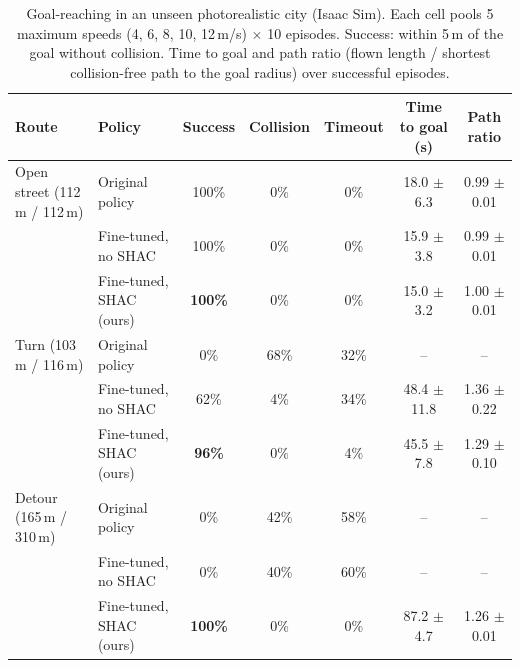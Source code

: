 \begin{table}[t]
\centering
\small
\caption{Goal-reaching in an unseen photorealistic city (Isaac Sim). Each cell pools 5 maximum speeds (4, 6, 8, 10, 12\,m/s) $\times$ 10 episodes. Success: within 5\,m of the goal without collision. Time to goal and path ratio (flown length / shortest collision-free path to the goal radius) over successful episodes.}
\label{tab:city}
\begin{tabular}{llccccc}
\toprule
Route & Policy & Success & Collision & Timeout & Time to goal (s) & Path ratio \\
\midrule
Open street (112\,m / 112\,m) & Original policy & 100\% & 0\% & 0\% & 18.0 $\pm$ 6.3 & 0.99 $\pm$ 0.01 \\
 & Fine-tuned, no SHAC & 100\% & 0\% & 0\% & 15.9 $\pm$ 3.8 & 0.99 $\pm$ 0.01 \\
 & Fine-tuned, SHAC (ours) & \textbf{100\%} & 0\% & 0\% & 15.0 $\pm$ 3.2 & 1.00 $\pm$ 0.01 \\
\midrule
Turn (103\,m / 116\,m) & Original policy & 0\% & 68\% & 32\% & -- & -- \\
 & Fine-tuned, no SHAC & 62\% & 4\% & 34\% & 48.4 $\pm$ 11.8 & 1.36 $\pm$ 0.22 \\
 & Fine-tuned, SHAC (ours) & \textbf{96\%} & 0\% & 4\% & 45.5 $\pm$ 7.8 & 1.29 $\pm$ 0.10 \\
\midrule
Detour (165\,m / 310\,m) & Original policy & 0\% & 42\% & 58\% & -- & -- \\
 & Fine-tuned, no SHAC & 0\% & 40\% & 60\% & -- & -- \\
 & Fine-tuned, SHAC (ours) & \textbf{100\%} & 0\% & 0\% & 87.2 $\pm$ 4.7 & 1.26 $\pm$ 0.01 \\
\bottomrule
\end{tabular}
\end{table}
